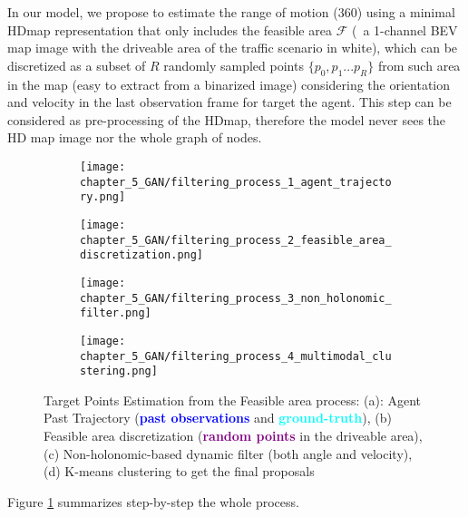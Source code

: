 In our model, we propose to estimate the range of motion (360\degree) using a minimal \ac{HDmap} representation that only includes the feasible area $\mathcal{F}$ (\ie \ a 1-channel \ac{BEV} map image with the driveable area of the traffic scenario in white), which can be discretized as a subset of $R$ randomly sampled points $\{p_0 , p_1 ... p_R\}$ from such area in the map (easy to extract from a binarized image) considering the orientation and velocity in the last observation frame for target the agent. This step can be considered as pre-processing of the \ac{HDmap}, therefore the model never sees the HD map image nor the whole graph of nodes. 

\begin{figure}[!ht]
	\centering
	\begin{subfigure}{0.24\textwidth}
		\texttt{[image: chapter\_5\_GAN/filtering\_process\_1\_agent\_trajectory.png]}	
		\caption{}
	\end{subfigure}
	\hfill
	\begin{subfigure}{0.24\textwidth}
		\texttt{[image: chapter\_5\_GAN/filtering\_process\_2\_feasible\_area\_discretization.png]}
		\caption{}
	\end{subfigure}
	\hfill
	\begin{subfigure}{0.24\textwidth}
		\texttt{[image: chapter\_5\_GAN/filtering\_process\_3\_non\_holonomic\_filter.png]}
		\caption{}
	\end{subfigure}
	\hfill
	\begin{subfigure}{0.24\textwidth}
		\texttt{[image: chapter\_5\_GAN/filtering\_process\_4\_multimodal\_clustering.png]}
		\caption{}
	\end{subfigure}
	\captionsetup{justification=justified}
	\caption[Target Points Estimation from the Feasible area process]{Target Points Estimation from the Feasible area process: (a): Agent Past Trajectory (\textbf{\textcolor{blue}{past observations}} and \textbf{\textcolor{aqua}{ground-truth}}), (b) Feasible area discretization (\textbf{\textcolor{purple}{random points}} in the driveable area), (c) Non-holonomic-based dynamic filter (both angle and velocity), (d) K-means clustering to get the final proposals}
	\label{fig:chapter_5_GAN/target_points_extraction}
\end{figure}

Figure \ref{fig:chapter_5_GAN/target_points_extraction} summarizes step-by-step the whole process.

